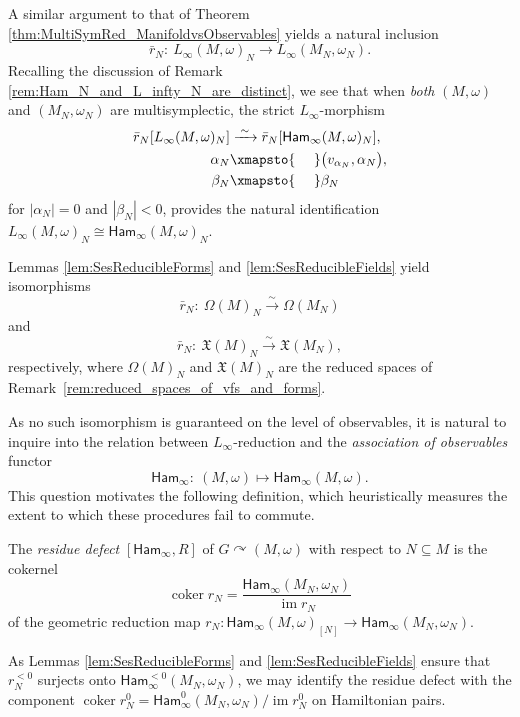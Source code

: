 \documentclass[pdftex]{sigma}
\numberwithin{equation}{section}
\newcommand{\Ham}{\mathsf{Ham}}
\newcommand{\X}{\mathfrak{X}}
\renewcommand{\subset}{\subseteq}
\begin{document}
\begin{Remark}\label{rem:associated_geometric_reduction_map}
	A similar argument to that of Theorem \ref{thm:MultiSymRed_ManifoldvsObservables} yields a natural inclusion
	\[
		\bar{r}_N \colon \ L_\infty(M,\omega)_N \to L_\infty(M_N,\omega_N).
	\]
	Recalling the discussion of Remark \ref{rem:Ham_N_and_L_infty_N_are_distinct}, we see that when \emph{both} $(M,\omega)$ and $(M_N,\omega_N)$ are multisymplectic, the strict $L_\infty$-morphism
	\begin{align*}
		\bar{r}_N[L_\infty(M,\omega)_N]		&\xrightarrow{\;\sim\;}	\bar{r}_N[\Ham_\infty(M,\omega)_N],	\\
		\alpha_N					&\xmapsto{\;\phantom{\sim}\;}		\bigl(v_{\alpha_N},\alpha_N\bigr),	\\
		\beta_N					&\xmapsto{\;\phantom{\sim}\;}		\beta_N
	\end{align*}
	for $|\alpha_N|=0$ and $|\beta_N|<0$, provides the natural identification $L_\infty(M,\omega)_N\cong\Ham_\infty(M,\omega)_N$.
\end{Remark}

Lemmas \ref{lem:SesReducibleForms} and \ref{lem:SesReducibleFields} yield isomorphisms
\[
	\bar{r}_N\colon \ \Omega(M)_N \xrightarrow{\sim} \Omega(M_N)
\]
and
\[
	\bar{r}_N\colon \ \X(M)_N \xrightarrow{\sim} \X(M_N),
\]
 respectively, where $\Omega(M)_N$ and $\X(M)_N$ are the reduced spaces of Remark~\ref{rem:reduced_spaces_of_vfs_and_forms}.

As no such isomorphism is guaranteed on the level of observables, it is natural to inquire into the relation between $L_\infty$-reduction and the \emph{association of observables} functor
\[
	\Ham_\infty \colon \ (M,\omega) \mapsto \Ham_\infty(M,\omega).
\]
This question motivates the following definition, which heuristically measures the extent to which these procedures fail to commute.

\begin{Definition}\label{def:residue_defect}
	The \emph{residue defect} $[\Ham_\infty,R]$ of $G\curvearrowright(M,\omega)$ with respect to $N\subset M$ is the cokernel
	\[
		\operatorname{coker} r_N = \frac{\Ham_\infty(M_N,\omega_N)}{\operatorname{im} r_N}
	\]
	of the geometric reduction map $r_N\colon \Ham_\infty(M,\omega)_{[N]}\to\Ham_\infty(M_N,\omega_N)$.
\end{Definition}

As Lemmas \ref{lem:SesReducibleForms} and \ref{lem:SesReducibleFields} ensure that $r_N^{<0}$ surjects onto $\Ham_\infty^{<0}(M_N,\omega_N)$, we may identify the residue defect with the component $\operatorname{coker}r_N^0 = \Ham_\infty^0(M_N,\omega_N) / \operatorname{im}r_N^0$ on Hamiltonian pairs.
\end{document}
